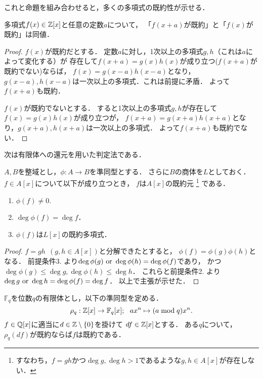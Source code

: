 \documentclass[lualatex, ja=standard, a4paper]{bxjsarticle}
\begin{document}
これと命題を組み合わせると，多くの多項式の既約性が示せる．
\begin{Prop}
    多項式$f(x) \in \mathbb{Z}[x]$と任意の定数$a$について，
    「$f(x+a)$が既約」と「$f(x)$が既約」は同値．
\end{Prop}
\begin{proof}
    $f(x)$が既約だとする．
    定数$a$に対し，1次以上の多項式$g,h$（これは$a$によって変化する）が
    存在して$f(x+a)=g(x)h(x)$が成り立つ($f(x+a)$が既約でない)ならば，
    $f(x)=g(x-a)h(x-a)$となり，$g(x-a), h(x-a)$は一次以上の多項式．これは前提に矛盾．
    よって$f(x+a)$も既約．

    $f(x)$が既約でないとする．
    すると1次以上の多項式$g,h$が存在して$f(x)=g(x)h(x)$が成り立つが，
    $f(x+a)=g(x+a) h(x+a)$となり，$g(x+a), h(x+a)$は一次以上の多項式．
    よって$f(x+a)$も既約でない．
\end{proof}

次は有限体への還元を用いた判定法である．
\begin{Thm}
    $A,B$を整域とし，$\phi: A \to B$を準同型とする．
    さらに$B$の商体を$L$としておく．
    $f \in A[x]$について以下が成り立つとき，
    $f$は$A[x]$の既約元
    \footnote{すなわち，$f=gh$かつ$\deg g, \deg h >1$であるような$g,h \in A[x]$が存在しない．}
    である．
    \begin{enumerate}
        \item $\phi(f) \neq 0$.
        \item $\deg \phi(f)=\deg f$．
        \item $\phi(f)$は$L[x]$の既約多項式．
    \end{enumerate}
\end{Thm}
\begin{proof}
    $f=gh ~~(g,h \in A[x])$と分解できたとすると，
    $\phi(f)=\phi(g) \phi(h)$となる．
    前提条件3. より$\deg \phi(g) \text{ or } \deg \phi(h)=\deg \phi(f)$であり，
    かつ$\deg \phi(g) \leq \deg g, \deg \phi(h) \leq \deg h$．
    これらと前提条件2. より$\deg g \text{ or } \deg h=\deg \phi(f)=\deg f$．
    以上で主張が示せた．
\end{proof}

\begin{Cor}
    $\mathbb{F}_q$を位数$q$の有限体とし，以下の準同型を定める．
    \[ \rho_q: \mathbb{Z}[x] \to \mathbb{F}_q[x];~~ ax^n \mapsto (a \bmod q)x^n. \]
    $f \in \mathbb{Q}[x]$に適当に$d \in \mathbb{Z} \setminus \{0\}$を掛けて
    $df \in \mathbb{Z}[x]$とする．
    ある$q$について，$\rho_q(df)$が既約ならば$f$は既約である．
\end{Cor}
\end{document}
